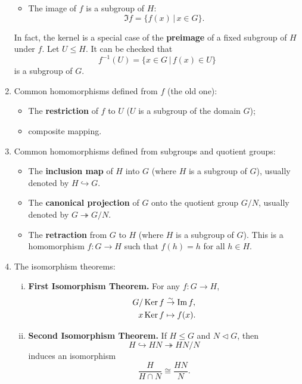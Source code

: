 \begin{enumerate}[(1)]
\begin{itemize}
\begin{equation*}
		\end{equation*}
		\item The image of $f$ is a subgroup of $H$:
		\begin{equation*}
			\Im  f = \{f(x)\,|\, x\in G\}.
		\end{equation*}
	\end{itemize}
	In fact, the kernel is a special case of the \textbf{preimage} of a fixed subgroup of $H$ under $f$. Let $U\leq H$. It can be checked that
	\begin{equation*}
		f^{-1}(U) = \{x\in G\,|\, f(x)\in U\}
	\end{equation*}
	is a subgroup of $G$.
	\item Common homomorphisms defined from $f$ (the old one):
	\begin{itemize}
		\item The \textbf{restriction} of $f$ to $U$ ($U$ is a subgroup of the domain $G$);
		\item composite mapping.
	\end{itemize}
	\item Common homomorphisms defined from subgroups and quotient groups:
	\begin{itemize}
		\item The \textbf{inclusion map} of $H$ into $G$ (where $H$ is a subgroup of $G$), usually denoted by $H\hookrightarrow G$.
		\item The \textbf{canonical projection} of $G$ onto the quotient group $G/N$, usually denoted by $G \twoheadrightarrow G/N$.
		\item  The \textbf{retraction} from $G$  to $H$ (where $H$ is a subgroup of $G$). This is a homomorphism $f:G\rightarrow H$ such that $f(h)=h$ for all $h\in H$.
	\end{itemize}
	\item The isomorphism theorems:
	\begin{enumerate}[(i)]
		\item \textbf{First Isomorphism Theorem.} For any $f:G\rightarrow H$,
		\begin{align*}
			G/\operatorname{Ker} f &\stackrel{\sim}{\rightarrow} \operatorname{Im}  f,\\
			x \operatorname{Ker} f& \mapsto f(x).
		\end{align*}
		\item \textbf{Second Isomorphism Theorem.} If $H\leq G$ and $N\lhd G$, then $$H\hookrightarrow HN \twoheadrightarrow HN/N$$ induces an isomorphism
		\begin{equation*}
			\frac{H}{H\cap N} \cong \frac{HN}{N}.

\end{equation*}
\end{enumerate}
\end{enumerate}
